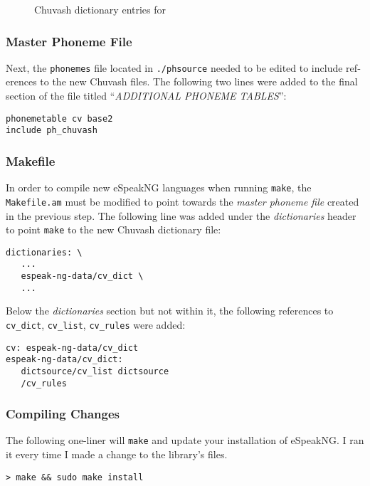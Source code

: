 \documentclass[11pt,a4paper]{article}
\begin{document}
\begin{figure}[h!]
	\centering
	\qquad

\caption{Chuvash dictionary entries for }
\end{figure}

\begin{otherlanguage}{english}
\subsubsection{Master Phoneme File}
Next, the \texttt{phonemes} file located in \texttt{./phsource} needed to be edited to include references to the new Chuvash files. The following two lines were added to the final section of the file titled ``\textit{ADDITIONAL PHONEME TABLES}'':
\begin{verbatim}
phonemetable cv base2
include ph_chuvash
\end{verbatim}

\subsubsection{Makefile}
In order to compile new eSpeakNG languages when running \texttt{make}, the \texttt{Makefile.am} must be modified to point towards the \textit{master phoneme file} created in the previous step. The following line was added under the \textit{dictionaries} header to point \texttt{make} to the new Chuvash dictionary file:
\begin{Verbatim}
dictionaries: \
   ...
   espeak-ng-data/cv_dict \
   ...
\end{Verbatim}

Below the \textit{dictionaries} section but not within it, the following references to \texttt{cv\_dict}, \texttt{cv\_list}, \texttt{cv\_rules} were added:

\begin{verbatim}
cv: espeak-ng-data/cv_dict
espeak-ng-data/cv_dict: 
   dictsource/cv_list dictsource 
   /cv_rules
\end{verbatim}

\subsubsection{Compiling Changes}
The following one-liner will \texttt{make} and update your installation of eSpeakNG. I ran it every time I made a change to the library's files.
\begin{verbatim}
> make && sudo make install
\end{verbatim}


\end{otherlanguage}
\end{document}
